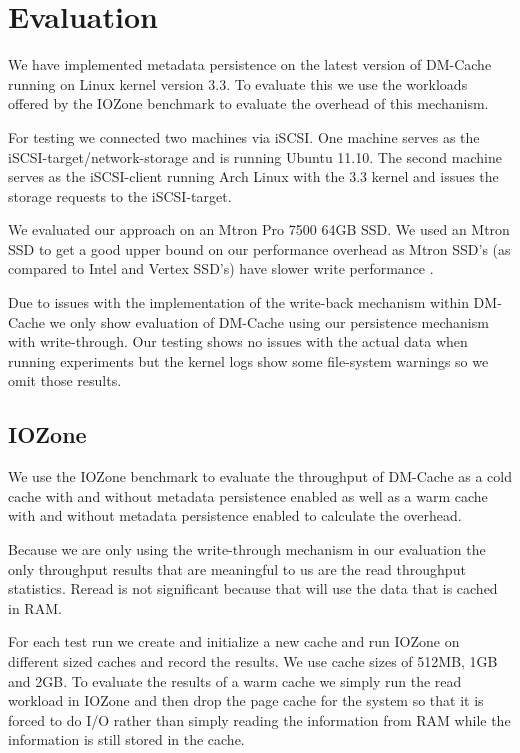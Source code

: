\section{Evaluation}
\label{sec:evaluation}

We have implemented metadata persistence on the latest version of
DM-Cache running on Linux kernel version 3.3. To evaluate this we use
the workloads offered by the IOZone benchmark to evaluate the overhead
of this mechanism.

For testing we connected two machines via iSCSI. One machine serves as
the iSCSI-target/network-storage and is running Ubuntu 11.10. The
second machine serves as the iSCSI-client running Arch Linux with the
3.3 kernel and issues the storage requests to the iSCSI-target.

We evaluated our approach on an Mtron Pro 7500 64GB SSD. We used an
Mtron SSD to get a good upper bound on our performance overhead as
Mtron SSD's (as compared to Intel and Vertex SSD's) have slower write
performance \cite{FIOS}.

Due to issues with the implementation of the write-back mechanism
within DM-Cache we only show evaluation of DM-Cache using our
persistence mechanism with write-through. Our testing shows no issues
with the actual data when running experiments but the kernel logs show
some file-system warnings so we omit those results.

\subsection{IOZone}

We use the IOZone benchmark to evaluate the throughput of DM-Cache as
a cold cache with and without metadata persistence enabled as well as
a warm cache with and without metadata persistence enabled to
calculate the overhead.

Because we are only using the write-through mechanism in our
evaluation the only throughput results that are meaningful to us are
the read throughput statistics. Reread is not significant because that
will use the data that is cached in RAM.

For each test run we create and initialize a new cache and run IOZone
on different sized caches and record the results. We use cache sizes
of 512MB, 1GB and 2GB. To evaluate the results of a warm cache we
simply run the read workload in IOZone and then drop the page cache
for the system so that it is forced to do I/O rather than simply
reading the information from RAM while the information is still stored
in the cache.

